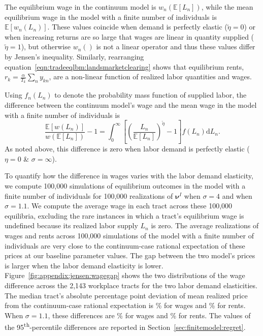 \documentclass[11pt]{article}
\theoremstyle{definition}
\begin{document}
The equilibrium wage in the continuum model is $w_{n}\left(\mathbb{E}\left[L_n\right]\right)$,
while the mean equilibrium wage in the model with a finite number of individuals is $\mathbb{E}\left[w_{n}\left(L_n\right)\right]$.
These values coincide when demand is perfectly elastic ($\tilde{\eta}=0$) or when increasing returns are so large that wages are linear in quantity supplied ($\tilde{\eta}=1$),
but otherwise $w_n()$ is not a linear operator and thus these values differ by Jensen's inequality.
Similarly, rearranging equation~\eqref{eqn:tradeeqlbm:landsmarketclearing} shows that equilibrium rents,
$r_k = \frac{\alpha}{T_k} \sum_n y_{kn}$,
are a non-linear function of realized labor quantities and wages.

Using $f_n(L_n)$ to denote the probability mass function of supplied labor,
the difference between the continuum model's wage and the mean wage in the model with a finite number of individuals is
\begin{equation*}
\frac{\mathbb{E}\left[w(L_{n})\right]}{w(\mathbb{E} \left[L_{n}\right])} - 1
=
\int_0^\infty \left[ \left( \frac{L_n}{\mathbb{E}[L_n]} \right)^{\tilde{\eta}} - 1 \right] f(L_{n}) \textrm{d}L_{n}
.\end{equation*}
As noted above, this difference is zero when labor demand is perfectly elastic ($\eta = 0$ \& $\sigma = \infty$).


To quantify how the difference in wages varies with the labor demand elasticity,
we compute 100,000 simulations of equilibrium outcomes in the model with a finite number of individuals
for 100,000 realizations of $\mathbf{\nu}^{I}$ when $\sigma = 4$ and when $\sigma = 1.1$.
We compute the average wage in each tract across these 100,000 equilibria,
excluding the rare instances in which a tract's equilibrium wage is undefined because its realized labor supply $L_n$ is zero.
The average realizations of wages and rents across 100,000 simulations of the model with a finite number of individuals
are very close to 
the continuum-case rational expectation of these prices at our baseline parameter values.
The gap between the two model's prices is larger when the labor demand elasticity is lower.
Figure~\ref{fig:appendix:jensen:wagegap}
shows the two distributions of the wage difference across the 2,143 workplace tracts
for the two labor demand elasticities.
The median tract's absolute percentage point deviation of mean realized price from the continuum-case rational expectation is
\%
for wages and
\%
for rents.
When $\sigma = 1.1$, these differences are
\%
for wages and
\%
for rents.
The values of the 95\textsuperscript{th}-percentile differences are reported in Section~\ref{sec:finitemodel:regret}.
\end{document}

